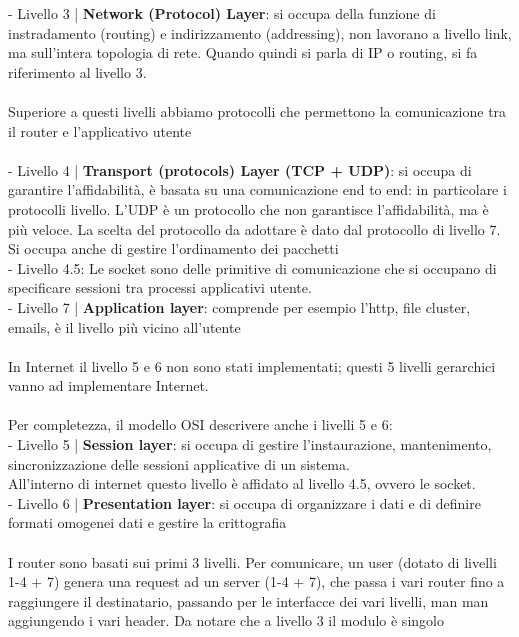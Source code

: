 \documentclass[11pt, oneside]{article}   	%
\begin{document}
- Livello 3 | \textbf{Network (Protocol) Layer}: si occupa della funzione di instradamento (routing) e indirizzamento (addressing), non lavorano a livello link, ma sull'intera topologia di rete. Quando quindi si parla di IP o routing, si fa riferimento al livello 3.\\\\
Superiore a questi livelli abbiamo protocolli che permettono la comunicazione tra il router e l'applicativo utente\\\\
- Livello 4 | \textbf{Transport (protocols) Layer (TCP + UDP)}: si occupa di garantire l'affidabilità, è basata su una comunicazione end to end: in particolare i protocolli livello. L'UDP è un protocollo che non garantisce l'affidabilità, ma è più veloce. La scelta del protocollo da adottare è dato dal protocollo di livello 7. Si occupa anche di gestire l'ordinamento dei pacchetti\\
- Livello 4.5: Le socket sono delle primitive di comunicazione che si occupano di specificare sessioni tra processi applicativi utente.\\
- Livello 7 | \textbf{Application layer}: comprende per esempio l'http, file cluster, emails, è il livello più vicino all'utente\\\\
In Internet il livello 5 e 6 non sono stati implementati; questi 5 livelli gerarchici vanno ad implementare Internet.\\\\
Per completezza, il modello OSI descrivere anche i livelli 5 e 6:\\
- Livello 5 | \textbf{Session layer}: si occupa di gestire l'instaurazione, mantenimento, sincronizzazione delle sessioni applicative di un sistema.\\
All'interno di internet questo livello è affidato al livello 4.5, ovvero le socket.\\
- Livello 6 | \textbf{Presentation layer}: si occupa di organizzare i dati e di definire formati omogenei dati e gestire la crittografia \\\\
I router sono basati sui primi 3 livelli. Per comunicare, un user (dotato di livelli 1-4 + 7)  genera una request ad un server (1-4 + 7), che passa i vari router fino a raggiungere il destinatario, passando per le interfacce dei vari livelli, man man aggiungendo i vari header. Da notare che a livello 3 il modulo è singolo \\
\end{document}
